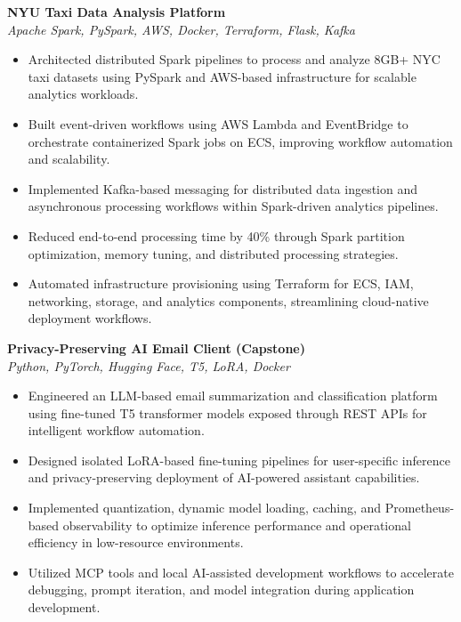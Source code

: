 \documentclass[12pt]{article}
\begin{document}
\textbf{NYU Taxi Data Analysis Platform} \\
\textit{Apache Spark, PySpark, AWS, Docker, Terraform, Flask, Kafka}

\begin{itemize}
    \item Architected distributed Spark pipelines to process and analyze 8GB+ NYC taxi datasets using PySpark and AWS-based infrastructure for scalable analytics workloads.
    
    \item Built event-driven workflows using AWS Lambda and EventBridge to orchestrate containerized Spark jobs on ECS, improving workflow automation and scalability.
    
    \item Implemented Kafka-based messaging for distributed data ingestion and asynchronous processing workflows within Spark-driven analytics pipelines.
    
    \item Reduced end-to-end processing time by 40\% through Spark partition optimization, memory tuning, and distributed processing strategies.
    
    \item Automated infrastructure provisioning using Terraform for ECS, IAM, networking, storage, and analytics components, streamlining cloud-native deployment workflows.
\end{itemize}

\textbf{Privacy-Preserving AI Email Client (Capstone)} \\
\textit{Python, PyTorch, Hugging Face, T5, LoRA, Docker}

\begin{itemize}
    \item Engineered an LLM-based email summarization and classification platform using fine-tuned T5 transformer models exposed through REST APIs for intelligent workflow automation.
    
    \item Designed isolated LoRA-based fine-tuning pipelines for user-specific inference and privacy-preserving deployment of AI-powered assistant capabilities.
    
    \item Implemented quantization, dynamic model loading, caching, and Prometheus-based observability to optimize inference performance and operational efficiency in low-resource environments.
    
    \item Utilized MCP tools and local AI-assisted development workflows to accelerate debugging, prompt iteration, and model integration during application development.
\end{itemize}
\end{document}
